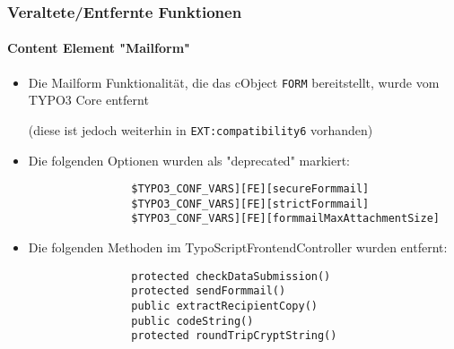 \begin{frame}[fragile]
	\frametitle{Veraltete/Entfernte Funktionen}
	\framesubtitle{Content Element "Mailform"}

	\begin{itemize}

		\item Die Mailform Funktionalität, die das cObject \texttt{FORM} bereitstellt,
			wurde vom TYPO3 Core entfernt

			\small
				(diese ist jedoch weiterhin in \texttt{EXT:compatibility6} vorhanden)
			\normalsize

		\item Die folgenden Optionen wurden als "deprecated" markiert:

			\begin{lstlisting}
				$TYPO3_CONF_VARS][FE][secureFormmail]
				$TYPO3_CONF_VARS][FE][strictFormmail]
				$TYPO3_CONF_VARS][FE][formmailMaxAttachmentSize]
			\end{lstlisting}

		\item Die folgenden Methoden im TypoScriptFrontendController wurden entfernt:

			\begin{lstlisting}
				protected checkDataSubmission()
				protected sendFormmail()
				public extractRecipientCopy()
				public codeString()
				protected roundTripCryptString()
			\end{lstlisting}

	\end{itemize}

\end{frame}


